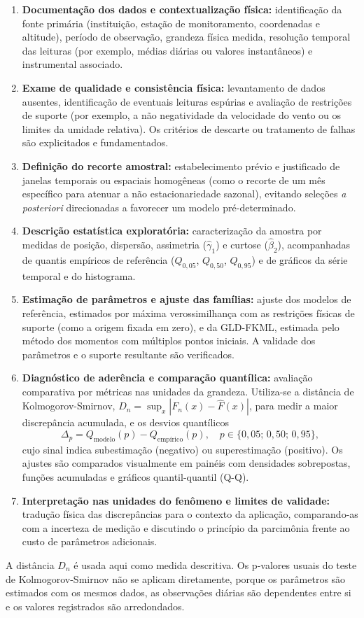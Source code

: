 \begin{enumerate}
    \item \textbf{Documentação dos dados e contextualização física:} identificação da fonte primária (instituição, estação de monitoramento, coordenadas e altitude), período de observação, grandeza física medida, resolução temporal das leituras (por exemplo, médias diárias ou valores instantâneos) e instrumental associado.

    \item \textbf{Exame de qualidade e consistência física:} levantamento de dados ausentes, identificação de eventuais leituras espúrias e avaliação de restrições de suporte (por exemplo, a não negatividade da velocidade do vento ou os limites da umidade relativa). Os critérios de descarte ou tratamento de falhas são explicitados e fundamentados.

    \item \textbf{Definição do recorte amostral:} estabelecimento prévio e justificado de janelas temporais ou espaciais homogêneas (como o recorte de um mês específico para atenuar a não estacionariedade sazonal), evitando seleções \textit{a posteriori} direcionadas a favorecer um modelo pré-determinado.

    \item \textbf{Descrição estatística exploratória:} caracterização da amostra por medidas de posição, dispersão, assimetria ($\widehat\gamma_1$) e curtose ($\widehat\beta_2$), acompanhadas de quantis empíricos de referência ($Q_{0,05}$, $Q_{0,50}$, $Q_{0,95}$) e de gráficos da série temporal e do histograma.

    \item \textbf{Estimação de parâmetros e ajuste das famílias:} ajuste dos modelos de referência, estimados por máxima verossimilhança com as restrições físicas de suporte (como a origem fixada em zero), e da GLD-FKML, estimada pelo método dos momentos com múltiplos pontos iniciais. A validade dos parâmetros e o suporte resultante são verificados.

    \item \textbf{Diagnóstico de aderência e comparação quantílica:} avaliação comparativa por métricas nas unidades da grandeza. Utiliza-se a distância de Kolmogorov-Smirnov, $D_n = \sup_x |F_n(x) - \widehat{F}(x)|$, para medir a maior discrepância acumulada, e os desvios quantílicos
    \begin{equation}
        \Delta_p = Q_{\text{modelo}}(p) - Q_{\text{empírico}}(p), \quad p \in \{0,05;\, 0,50;\, 0,95\},
        \label{eq:delta}
    \end{equation}
    cujo sinal indica subestimação (negativo) ou superestimação (positivo). Os ajustes são comparados visualmente em painéis com densidades sobrepostas, funções acumuladas e gráficos quantil-quantil (Q-Q).

    \item \textbf{Interpretação nas unidades do fenômeno e limites de validade:} tradução física das discrepâncias para o contexto da aplicação, comparando-as com a incerteza de medição e discutindo o princípio da parcimônia frente ao custo de parâmetros adicionais.
\end{enumerate}

A distância $D_n$ é usada aqui como medida descritiva. Os p-valores usuais do teste de Kolmogorov-Smirnov não se aplicam diretamente, porque os parâmetros são estimados com os mesmos dados, as observações diárias são dependentes entre si e os valores registrados são arredondados.
